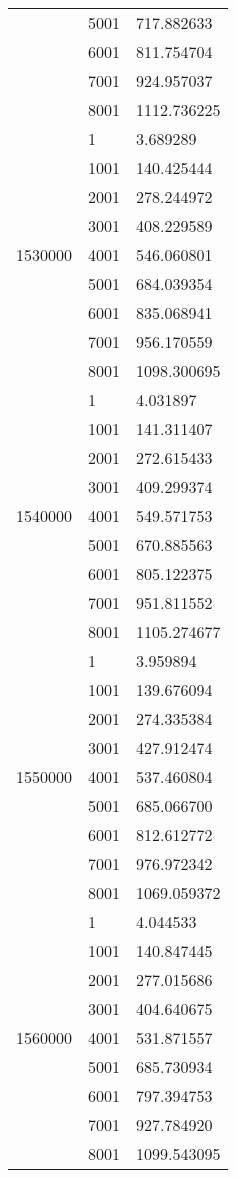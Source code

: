 \begin{table}[htb!]
\begin{tabular}{lll}
 & 5001 & 717.882633 \\
 & 6001 & 811.754704 \\
 & 7001 & 924.957037 \\
 & 8001 & 1112.736225 \\
\multirow[c]{9}{*}{1530000} & 1 & 3.689289 \\
 & 1001 & 140.425444 \\
 & 2001 & 278.244972 \\
 & 3001 & 408.229589 \\
 & 4001 & 546.060801 \\
 & 5001 & 684.039354 \\
 & 6001 & 835.068941 \\
 & 7001 & 956.170559 \\
 & 8001 & 1098.300695 \\
\multirow[c]{9}{*}{1540000} & 1 & 4.031897 \\
 & 1001 & 141.311407 \\
 & 2001 & 272.615433 \\
 & 3001 & 409.299374 \\
 & 4001 & 549.571753 \\
 & 5001 & 670.885563 \\
 & 6001 & 805.122375 \\
 & 7001 & 951.811552 \\
 & 8001 & 1105.274677 \\
\multirow[c]{9}{*}{1550000} & 1 & 3.959894 \\
 & 1001 & 139.676094 \\
 & 2001 & 274.335384 \\
 & 3001 & 427.912474 \\
 & 4001 & 537.460804 \\
 & 5001 & 685.066700 \\
 & 6001 & 812.612772 \\
 & 7001 & 976.972342 \\
 & 8001 & 1069.059372 \\
\multirow[c]{9}{*}{1560000} & 1 & 4.044533 \\
 & 1001 & 140.847445 \\
 & 2001 & 277.015686 \\
 & 3001 & 404.640675 \\
 & 4001 & 531.871557 \\
 & 5001 & 685.730934 \\
 & 6001 & 797.394753 \\
 & 7001 & 927.784920 \\
 & 8001 & 1099.543095 \\

\end{tabular}
\end{table}
